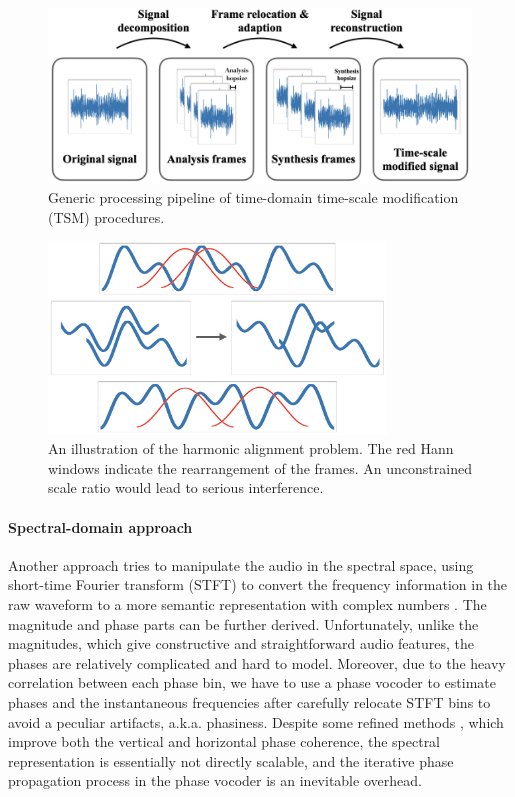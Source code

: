 \documentclass[12pt]{article}
\begin{document}
\begin{figure}
\begin{center}
  \includegraphics[width=.8\textwidth]{assets/figures/1}
\end{center}
\caption{Generic processing pipeline of time-domain time-scale modification (TSM) procedures.}
\label{fig:1}
\end{figure}

\begin{figure}
\begin{center}
  \includegraphics[width=0.8\textwidth]{assets/figures/2}
\end{center}
\caption{An illustration of the harmonic alignment problem. The red Hann windows indicate the rearrangement of the frames. An unconstrained scale ratio would lead to serious interference.}
\label{fig:2}
\end{figure}

\paragraph{Spectral-domain approach}
Another approach tries to manipulate the audio in the spectral space, using short-time Fourier transform (STFT) to convert the frequency information in the raw waveform to a more semantic representation with complex numbers \cite{lar99}. The magnitude and phase parts can be further derived. Unfortunately, unlike the magnitudes, which give constructive and straightforward audio features, the phases are relatively complicated and hard to model. Moreover, due to the heavy correlation between each phase bin, we have to use a phase vocoder \cite{fla66} to estimate phases and the instantaneous frequencies after carefully relocate STFT bins to avoid a peculiar artifacts, a.k.a. phasiness. Despite some refined methods \cite{kra12}\cite{moi11}\cite{nag09}, which improve both the vertical and horizontal phase coherence, the spectral representation is essentially not directly scalable, and the iterative phase propagation process in the phase vocoder is an inevitable overhead.
\end{document}
